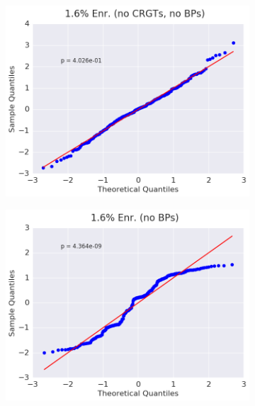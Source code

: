 \begin{figure}[h!]
\centering
\begin{subfigure}{0.5\textwidth}
  \centering
  \includegraphics[width=\linewidth]{figures/patterns/assm-1.6-inf/quantile/assm-16-inf-fiss-2}
  \caption{}
  \label{fig:chap9-qq-assm-1.6-inf-fiss}
\end{subfigure}%
\begin{subfigure}{0.5\textwidth}
  \centering
  \includegraphics[width=\linewidth]{figures/patterns/assm-1.6/quantile/assm-16-fiss-2}
  \caption{}
  \label{fig:chap9-qq-assm-1.6-fiss}
\end{subfigure}
\begin{subfigure}{0.5\textwidth}

\end{subfigure}
\end{figure}
